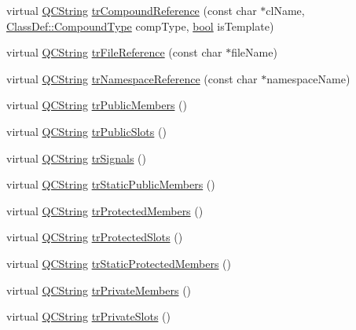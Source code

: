 \begin{DoxyCompactItemize}
\item 
virtual \hyperlink{class_q_c_string}{Q\+C\+String} \hyperlink{class_translator_chinesetraditional_abc223ad4429cb08482f3b5a259b59f95}{tr\+Compound\+Reference} (const char $\ast$cl\+Name, \hyperlink{class_class_def_ae70cf86d35fe954a94c566fbcfc87939}{Class\+Def\+::\+Compound\+Type} comp\+Type, \hyperlink{qglobal_8h_a1062901a7428fdd9c7f180f5e01ea056}{bool} is\+Template)
\item 
virtual \hyperlink{class_q_c_string}{Q\+C\+String} \hyperlink{class_translator_chinesetraditional_a4346906c175fb402dcf1e41e7f920b22}{tr\+File\+Reference} (const char $\ast$file\+Name)
\item 
virtual \hyperlink{class_q_c_string}{Q\+C\+String} \hyperlink{class_translator_chinesetraditional_ad795887762606aeb8f2103205c4dbee7}{tr\+Namespace\+Reference} (const char $\ast$namespace\+Name)
\item 
virtual \hyperlink{class_q_c_string}{Q\+C\+String} \hyperlink{class_translator_chinesetraditional_a62541b62178c26cd4ec03c321749d432}{tr\+Public\+Members} ()
\item 
virtual \hyperlink{class_q_c_string}{Q\+C\+String} \hyperlink{class_translator_chinesetraditional_acb9d7439fe778168a28ceb5fc8804657}{tr\+Public\+Slots} ()
\item 
virtual \hyperlink{class_q_c_string}{Q\+C\+String} \hyperlink{class_translator_chinesetraditional_a66e93aaa3a105dcd8003949d383ee633}{tr\+Signals} ()
\item 
virtual \hyperlink{class_q_c_string}{Q\+C\+String} \hyperlink{class_translator_chinesetraditional_a8df319d22741a159fe52cb12d6271c69}{tr\+Static\+Public\+Members} ()
\item 
virtual \hyperlink{class_q_c_string}{Q\+C\+String} \hyperlink{class_translator_chinesetraditional_ac46fb79e68428b651b197e0944a3bcb0}{tr\+Protected\+Members} ()
\item 
virtual \hyperlink{class_q_c_string}{Q\+C\+String} \hyperlink{class_translator_chinesetraditional_a1863ec93b89cbe1725a63e6d126f8e4a}{tr\+Protected\+Slots} ()
\item 
virtual \hyperlink{class_q_c_string}{Q\+C\+String} \hyperlink{class_translator_chinesetraditional_ae4950517d8895572a95d290a0505d903}{tr\+Static\+Protected\+Members} ()
\item 
virtual \hyperlink{class_q_c_string}{Q\+C\+String} \hyperlink{class_translator_chinesetraditional_a21290075d025d036912900a7401d4b3f}{tr\+Private\+Members} ()
\item 
virtual \hyperlink{class_q_c_string}{Q\+C\+String} \hyperlink{class_translator_chinesetraditional_a5216ed2d7f46b6d3c02d760b63bb45c1}{tr\+Private\+Slots} ()

\end{DoxyCompactItemize}
